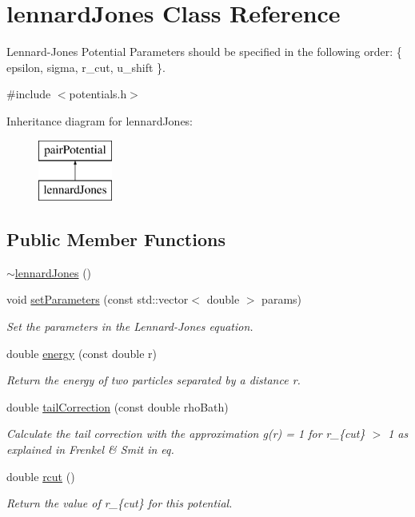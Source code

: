 \hypertarget{classlennard_jones}{}\section{lennard\+Jones Class Reference}
\label{classlennard_jones}


Lennard-\/\+Jones Potential Parameters should be specified in the following order\+: \{ epsilon, sigma, r\+\_\+cut, u\+\_\+shift \}.  




{\ttfamily \#include $<$potentials.\+h$>$}

Inheritance diagram for lennard\+Jones\+:\begin{figure}[H]
\begin{center}
\leavevmode
\includegraphics[height=2.000000cm]{classlennard_jones}
\end{center}
\end{figure}
\subsection*{Public Member Functions}
\begin{DoxyCompactItemize}
\item 
\hyperlink{classlennard_jones_aa05d64fac84629b8bfbbc1387a41119b}{$\sim$lennard\+Jones} ()
\item 
void \hyperlink{classlennard_jones_a5b4c41df05048ce99bffb9f27733100a}{set\+Parameters} (const std\+::vector$<$ double $>$ params)
\begin{DoxyCompactList}\small\item\em Set the parameters in the Lennard-\/\+Jones equation. \end{DoxyCompactList}\item 
double \hyperlink{classlennard_jones_af90284faab4a29b15099794c25333a64}{energy} (const double r)
\begin{DoxyCompactList}\small\item\em Return the energy of two particles separated by a distance r. \end{DoxyCompactList}\item 
double \hyperlink{classlennard_jones_a4518a7a9970c1fbed2f2abcf0ceebbfc}{tail\+Correction} (const double rho\+Bath)
\begin{DoxyCompactList}\small\item\em Calculate the tail correction with the approximation g(r) = 1 for r\+\_\+\{cut\} $>$ 1 as explained in Frenkel \& Smit in eq. \end{DoxyCompactList}\item 
double \hyperlink{classlennard_jones_a6ab5b04c385544da0de985e9635a6e8c}{rcut} ()
\begin{DoxyCompactList}\small\item\em Return the value of r\+\_\+\{cut\} for this potential. \end{DoxyCompactList}\end{DoxyCompactItemize}
